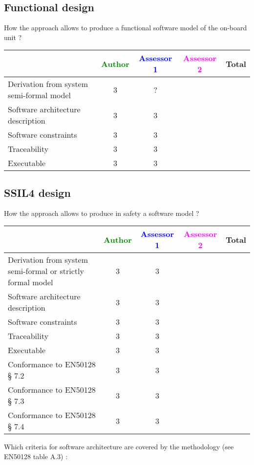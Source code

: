 \subsection{Functional design}

How the approach allows to  produce a functional software model of the on-board unit ?

\begin{tabular}{|l | c | c | c | c|}
\hline
& \textcolor{green}{Author} & \textcolor{blue}{Assessor 1} & \textcolor{magenta}{Assessor 2} & Total \\
\hline
Derivation from system semi-formal model  & 3 & ? & &  \\
\hline 
Software architecture description  & 3 & 3 & &  \\
\hline
Software constraints  & 3 & 3 & &  \\
\hline
Traceability  & 3 & 3 & &  \\
\hline
Executable  & 3  & 3 & &  \\
\hline
\end{tabular}

\subsection{SSIL4 design}

How the approach allows to  produce in safety a software model ?

\begin{tabular}{|l | c | c | c | c|}
\hline
& \textcolor{green}{Author} & \textcolor{blue}{Assessor 1} & \textcolor{magenta}{Assessor 2} & Total \\
\hline
Derivation from system semi-formal or strictly formal model  & 3 & 3 & &  \\
\hline 
Software architecture description  & 3 & 3 & &  \\
\hline
Software constraints  & 3 & 3 & &  \\
\hline
Traceability  & 3 & 3 & &  \\
\hline
Executable  & 3 & 3 & &  \\
\hline
Conformance to EN50128 § 7.2  & 3 & 3 & &  \\
\hline
Conformance to EN50128 § 7.3  & 3 & 3 & &  \\
\hline
Conformance to EN50128 § 7.4  & 3 & 3 & &  \\
\hline
\end{tabular}

Which criteria for software architecture are covered by the methodology
(see EN50128 table A.3) :

